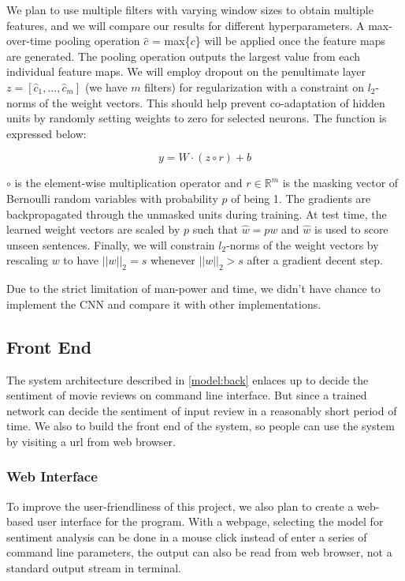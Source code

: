 \documentclass[conference]{IEEEtran}
\begin{document}
    We plan to use multiple filters with varying window sizes to obtain multiple features, and we will
    compare our results for different hyperparameters.
    A max-over-time pooling operation $\hat{c}$ = max\{$c$\} will be applied once the feature
    maps are generated. The pooling operation outputs the largest value from each individual
    feature maps. We will employ dropout on the penultimate layer $z = [\hat{c}_1,...,\hat{c}_m]$
    (we have $m$ filters) for regularization with a constraint on $l_2$-norms of the weight
    vectors. This should help prevent co-adaptation of hidden units by randomly setting weights
    to zero for selected neurons. The function is expressed below:

    \begin{equation}
    y = W \cdot (z \circ r) + b
    \end{equation}

    $\circ$ is the element-wise multiplication operator and $r \in \mathbb{R}^m$ is
    the masking vector of Bernoulli random variables with probability $p$ of being 1.
    The gradients are backpropagated through the unmasked units during training. At test
    time, the learned weight vectors are scaled by $p$ such that $\hat{w} = pw$ and $\hat{w}$
    is used to score unseen sentences. Finally, we will constrain $l_2$-norms of the weight
    vectors by rescaling $w$ to have $||w||_2 = s$ whenever $||w||_2 > s$ after a gradient
    decent step.
    
    Due to the strict limitation of man-power and time, we didn't have chance to 
    implement the CNN and compare it with other implementations.

\subsection{Front End}
\label{model:front}
    
    The system architecture described in \autoref{model:back} enlaces up to decide the
    sentiment of movie reviews on command line interface. But since a trained network can
    decide the sentiment of input review in a reasonably short period of time. We also
    to build the front end of the system, so people can use the system by visiting a
    url from web browser.
    
\subsubsection{Web Interface}
\label{model:front:web}
    To improve the user-friendliness of this project, we also plan to create a 
    web-based user interface for the program. With a webpage, selecting
    the model for sentiment analysis can be done in a mouse click instead of 
    enter a series of command line parameters, the output can also
    be read from web browser, not a standard output stream in terminal. 
    
\end{document}
